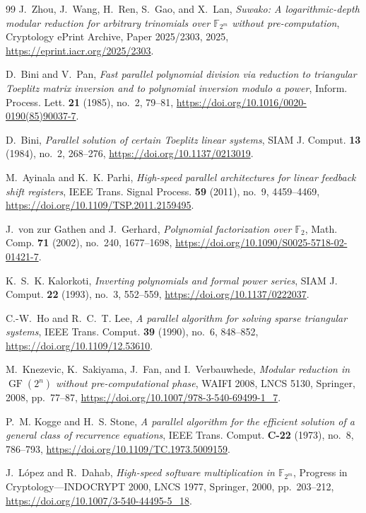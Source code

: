 \documentclass{mcom-l}
\numberwithin{equation}{section}
\theoremstyle{definition}
\theoremstyle{remark}
\begin{document}
\begin{thebibliography}{99}
J.~Zhou, J.~Wang, H.~Ren, S.~Gao, and X.~Lan,
\emph{Suwako: A logarithmic-depth modular reduction for arbitrary trinomials
over $\mathbb F_{2^m}$ without pre-computation}, Cryptology ePrint Archive,
Paper 2025/2303, 2025, \url{https://eprint.iacr.org/2025/2303}.

D.~Bini and V.~Pan, \emph{Fast parallel polynomial division via reduction to
triangular Toeplitz matrix inversion and to polynomial inversion modulo a
power}, Inform. Process. Lett. \textbf{21} (1985), no.~2,
79--81, \url{https://doi.org/10.1016/0020-0190(85)90037-7}.

D.~Bini, \emph{Parallel solution of certain Toeplitz linear systems},
SIAM J. Comput. \textbf{13} (1984), no.~2, 268--276,
\url{https://doi.org/10.1137/0213019}.

M.~Ayinala and K.~K. Parhi, \emph{High-speed parallel architectures for
linear feedback shift registers}, IEEE Trans. Signal Process. \textbf{59}
(2011), no.~9, 4459--4469,
\url{https://doi.org/10.1109/TSP.2011.2159495}.

J.~von zur Gathen and J.~Gerhard, \emph{Polynomial factorization over
$\mathbb F_2$}, Math. Comp. \textbf{71} (2002), no.~240, 1677--1698,
\url{https://doi.org/10.1090/S0025-5718-02-01421-7}.

K.~S.~K. Kalorkoti, \emph{Inverting polynomials and formal power series},
SIAM J. Comput. \textbf{22} (1993), no.~3, 552--559,
\url{https://doi.org/10.1137/0222037}.

C.-W.~Ho and R.~C.~T. Lee, \emph{A parallel algorithm for solving sparse
triangular systems}, IEEE Trans. Comput. \textbf{39} (1990), no.~6,
848--852, \url{https://doi.org/10.1109/12.53610}.

M.~Knezevic, K.~Sakiyama, J.~Fan, and I.~Verbauwhede, \emph{Modular reduction
in $\operatorname{GF}(2^n)$ without pre-computational phase}, WAIFI 2008,
LNCS 5130, Springer, 2008, pp.~77--87,
\url{https://doi.org/10.1007/978-3-540-69499-1_7}.

P.~M. Kogge and H.~S. Stone, \emph{A parallel algorithm for the efficient
solution of a general class of recurrence equations}, IEEE Trans. Comput.
\textbf{C-22} (1973), no.~8, 786--793,
\url{https://doi.org/10.1109/TC.1973.5009159}.

J.~L\'opez and R.~Dahab, \emph{High-speed software multiplication in
$\mathbb F_{2^m}$}, Progress in Cryptology---INDOCRYPT 2000, LNCS 1977,
Springer, 2000, pp.~203--212,
\url{https://doi.org/10.1007/3-540-44495-5_18}.


\end{thebibliography}
\end{document}
